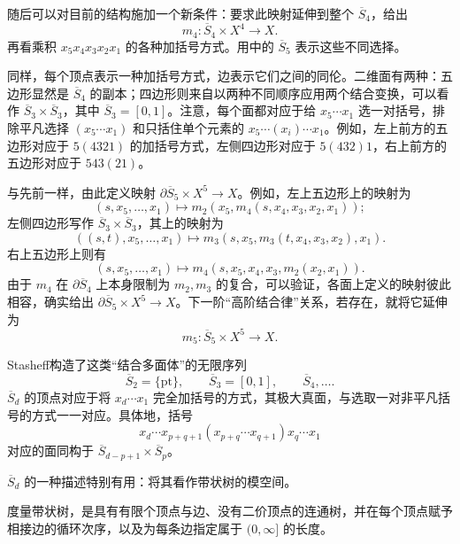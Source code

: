 随后可以对目前的结构施加一个新条件：要求此映射延伸到整个 $\overline S_4$，给出
\[
m_4\colon\overline S_4\times X^4\longrightarrow X.
\]
再看乘积 $x_5x_4x_3x_2x_1$ 的各种加括号方式。用中的 $\overline S_5$ 表示这些不同选择。
\begin{figure}[H]
\centering
{}
\BookNumberOnlyCaption\label{fig:8.3}
\end{figure}

同样，每个顶点表示一种加括号方式，边表示它们之间的同伦。二维面有两种：五边形显然是 $\overline S_4$ 的副本；四边形则来自以两种不同顺序应用两个结合变换，可以看作 $\overline S_3\times\overline S_3$，其中 $\overline S_3=[0,1]$。注意，每个面都对应于给 $x_5\cdots x_1$ 选一对括号，排除平凡选择 $(x_5\cdots x_1)$ 和只括住单个元素的 $x_5\cdots(x_i)\cdots x_1$。例如，左上前方的五边形对应于 $5(4321)$ 的加括号方式，左侧四边形对应于 $5(432)1$，右上前方的五边形对应于 $543(21)$。

与先前一样，由此定义映射 $\partial\overline S_5\times X^5\to X$。例如，左上五边形上的映射为
\[
(s,x_5,\ldots,x_1)\longmapsto m_2(x_5,m_4(s,x_4,x_3,x_2,x_1));
\]
左侧四边形写作 $\overline S_3\times\overline S_3$，其上的映射为
\[
((s,t),x_5,\ldots,x_1)\longmapsto
m_3(s,x_5,m_3(t,x_4,x_3,x_2),x_1).
\]
右上五边形上则有
\[
(s,x_5,\ldots,x_1)\longmapsto m_4(s,x_5,x_4,x_3,m_2(x_2,x_1)).
\]
由于 $m_4$ 在 $\partial\overline S_4$ 上本身限制为 $m_2,m_3$ 的复合，可以验证，各面上定义的映射彼此相容，确实给出 $\partial\overline S_5\times X^5\to X$。下一阶“高阶结合律”关系，若存在，就将它延伸为
\[
m_5\colon\overline S_5\times X^5\longrightarrow X.
\]

Stasheff构造了这类“结合多面体”的无限序列
\[
\overline S_2=\{\mathrm{pt}\},\qquad\overline S_3=[0,1],
\qquad\overline S_4,\ldots.
\]
$\overline S_d$ 的顶点对应于将 $x_d\cdots x_1$ 完全加括号的方式，其极大真面，与选取一对非平凡括号的方式一一对应。具体地，括号
\[
x_d\cdots x_{p+q+1}(x_{p+q}\cdots x_{q+1})x_q\cdots x_1
\]
对应的面同构于 $\overline S_{d-p+1}\times\overline S_p$。

$\overline S_d$ 的一种描述特别有用：将其看作带状树的模空间。
\begin{definition}\label{def:8.1}
度量带状树，是具有有限个顶点与边、没有二价顶点的连通树，并在每个顶点赋予相接边的循环次序，以及为每条边指定属于 $(0,\infty]$ 的长度。
\end{definition}

